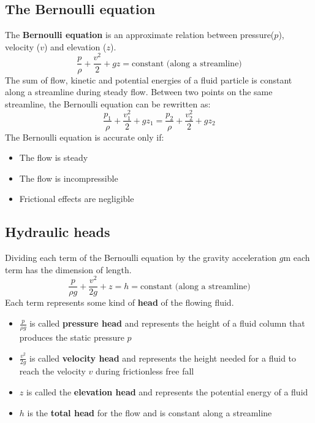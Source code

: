 \documentclass[class=report, crop=false, 12pt,a4paper]{standalone}
\begin{document}
\subsection{The Bernoulli equation}
The \textbf{Bernoulli equation} is an approximate relation between pressure($p$), velocity ($v$) and elevation ($z$).
\begin{equation}
  \frac{p}{\rho} + \frac{v^2}{2} + gz = \textrm{constant (along a streamline)}
\end{equation}
The sum of flow, kinetic and potential energies of a fluid particle is constant along a streamline during steady flow. Between two points on the same streamline, the Bernoulli equation can be rewritten as:
\begin{equation}
  \frac{p_1}{\rho} + \frac{v_1^2}{2}+ gz_1 = \frac{p_2}{\rho} + \frac{v_2^2}{2} + gz_2
\end{equation}
The Bernoulli equation is accurate only if:
\begin{itemize}
  \item The flow is steady
  \item The flow is incompressible
  \item Frictional effects are negligible
\end{itemize}
\subsection{Hydraulic heads}
Dividing each term of the Bernoulli equation by the gravity acceleration $g$m each term has the dimension of length.
\begin{equation}
  \frac{p}{\rho g} + \frac{v^2}{2g} +z = h = \textrm{constant (along a streamline)}
\end{equation}
Each term represents some kind of \textbf{head} of the flowing fluid.
\begin{itemize}
  \item $\frac{p}{\rho g}$ is called \textbf{pressure head} and represents the height of a fluid column that produces the static pressure $p$
  \item $\frac{v^2}{2g}$ is called \textbf{velocity head} and represents the height needed for a fluid to reach the velocity $v$ during frictionless free fall
  \item $z$ is called the \textbf{elevation head} and represents the potential energy of a fluid
  \item $h$ is the \textbf{total head} for the flow and is constant along a streamline
\end{itemize}
\end{document}
